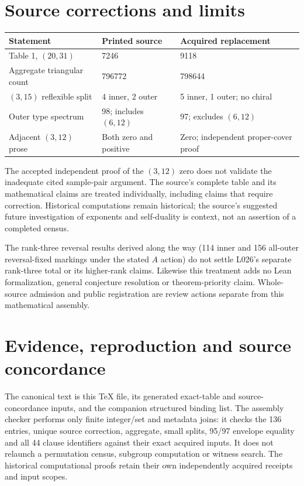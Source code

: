 \documentclass[11pt,a4paper]{article}
\begin{document}
\section{Source corrections and limits}\label{sec:corrections}
\begin{center}\small
\begin{tabular}{p{}p{}p{}}\toprule
Statement&Printed source&Acquired replacement\\\midrule
Table 1, $(20,31)$&7246&9118\\
Aggregate triangular count&796772&798644\\
$(3,15)$ reflexible split&4 inner, 2 outer&5 inner, 1 outer; no chiral\\
Outer type spectrum&98; includes $(6,12)$&97; excludes $(6,12)$\\
Adjacent $(3,12)$ prose&Both zero and positive&Zero; independent proper-cover proof\\\bottomrule
\end{tabular}
\end{center}
The accepted independent proof of the $(3,12)$ zero does not validate
the inadequate cited sample-pair argument. The source's complete table
and its mathematical claims are treated individually, including claims
that require correction. Historical computations remain historical;
the source's suggested future investigation of exponents and self-duality
is context, not an assertion of a completed census.

The rank-three reversal results derived along the way (114 inner and
156 all-outer reversal-fixed markings under the stated $A$ action) do
not settle L026's separate rank-three total or its higher-rank claims.
Likewise this treatment adds no Lean formalization, general conjecture
resolution or theorem-priority claim. Whole-source admission and public
registration are review actions separate from this mathematical assembly.

\section{Evidence, reproduction and source concordance}\label{sec:evidence}
The canonical text is this TeX file, its generated exact-table and
source-concordance inputs, and the companion structured binding list.
The assembly checker performs only finite integer/set and metadata joins:
it checks the 136 entries, unique source correction, aggregate, small
splits, 95/97 envelope equality and all 44 clause identifiers against
their exact acquired inputs. It does not relaunch a permutation census,
subgroup computation or witness search. The historical computational
proofs retain their own independently acquired receipts and input scopes.
\end{document}
